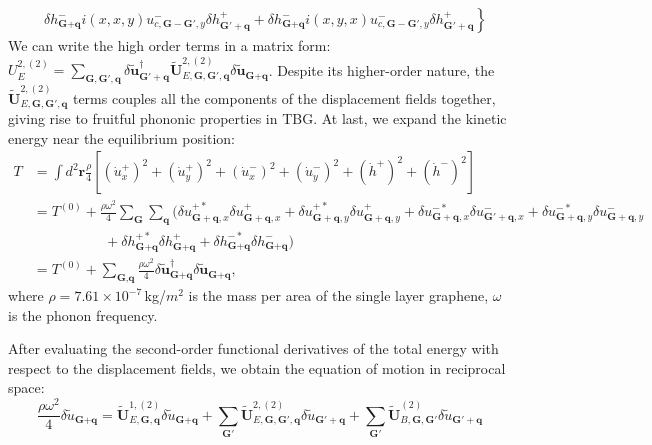 \documentclass[aps,prx,10pt,twocolumn,superscriptaddress]{revtex4}
\begin{document}
\begin{widetext}
\begin{align}
&\left.\delta h^{-}_{\textbf{G}+\textbf{q}}i(x,x,y)u^{-}_{c,\textbf{G}-\textbf{G}',y}\delta h^{+}_{\textbf{G}'+\textbf{q}}+\delta h^{-}_{\textbf{G}+\textbf{q}}i(x,y,x)u^{-}_{c,\textbf{G}-\textbf{G}',y}\delta h^{+}_{\textbf{G}'+\textbf{q}}\right\}
\end{align}
We can write the high order terms in a matrix form: $U^{2,(2)}_{E}=\sum_{\textbf{G},\textbf{G}',\textbf{q}}\delta\tilde{\textbf{u}}^{\dagger}_{\textbf{G}'+\textbf{q}}\tilde{\textbf{U}}^{2,(2)}_{E,\textbf{G},\textbf{G}',\textbf{q}}\delta\tilde{\textbf{u}}_{\textbf{G}+\textbf{q}}$. Despite its higher-order nature, the $\tilde{\textbf{U}}^{2,(2)}_{E,\textbf{G},\textbf{G}',\textbf{q}}$ terms couples all the components of the displacement fields together, giving rise to fruitful phononic properties in TBG. At last, we expand the kinetic energy near the equilibrium position:
\begin{equation}
\begin{split}
T&=\int d^{2}\textbf{r}\frac{\rho}{4}\left[ (\dot{u}^{+}_{x})^{2}+ (\dot{u}^{+}_{y})^{2}+ (\dot{u}^{-}_{x})^{2}+ (\dot{u}^{-}_{y})^{2}+(\dot{h}^{+})^{2}+(\dot{h}^{-})^{2} \right]\\
&=T^{(0)}+\frac{\rho\omega^{2}}{4}\sum_{\textbf{G}}\sum_{\textbf{q}}(\delta u^{+*}_{\textbf{G}+\textbf{q},x}\delta u^{+}_{\textbf{G}+\textbf{q},x}+\delta u^{+*}_{\textbf{G}+\textbf{q},y}\delta u^{+}_{\textbf{G}+\textbf{q},y}+\delta u^{-*}_{\textbf{G}+\textbf{q},x}\delta u^{-}_{\textbf{G}'+\textbf{q},x}+\delta u^{-*}_{\textbf{G}+\textbf{q},y}\delta u^{-}_{\textbf{G}+\textbf{q},y}\\
&\ \ \ \ \ \ \ \ \ \ \ \ \ \ \ \ \ \ \ \ \ \ \  +\delta h^{+*}_{\textbf{G}+\textbf{q}}\delta h^{+}_{\textbf{G}+\textbf{q}}+\delta h^{-*}_{\textbf{G}+\textbf{q}}\delta h^{-}_{\textbf{G}+\textbf{q}})\\
&=T^{(0)}+\sum_{\textbf{G},\textbf{q}}\frac{\rho\omega^{2}}{4}\delta\tilde{\textbf{u}}^{\dagger}_{\textbf{G}+\textbf{q}}\delta\tilde{\textbf{u}}_{\textbf{G}+\textbf{q}}, 
\end{split}
\end{equation}
where $\rho\!=\!7.61\times 10^{-7}\,$kg/$m^{2}$ is the mass per area of the single layer graphene, $\omega$ is the phonon frequency. 

After evaluating the second-order functional derivatives of the total energy with respect to the displacement fields, we obtain the equation of motion in reciprocal space:
\begin{equation}
\frac{\rho\omega^{2}}{4}\delta\tilde{u}_{\textbf{G}+\textbf{q}}=\tilde{\textbf{U}}^{1,(2)}_{E,\textbf{G},\textbf{q}}\delta\tilde{u}_{\textbf{G}+\textbf{q}}+\sum_{\textbf{G}'}\tilde{\textbf{U}}^{2,(2)}_{E,\textbf{G},\textbf{G}',\textbf{q}}\delta\tilde{u}_{\textbf{G}'+\textbf{q}}+\sum_{\textbf{G}'}\tilde{\textbf{U}}^{(2)}_{B,\textbf{G},\textbf{G}'}\delta\tilde{u}_{\textbf{G}'+\textbf{q}}
\end{equation}


\end{widetext}
\end{document}
